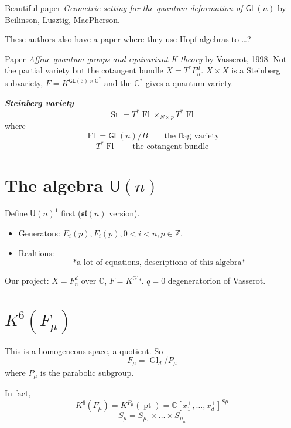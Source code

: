 \begin{thing4}{Beautiful paper}\leavevmode
	\textit{Geometric setting for the quantum deformation of $\mathsf{GL}(n)$} by Beilinson, Lusztig, MacPherson. 
\end{thing4}

\begin{remark}[Altan]\leavevmode
	These authors also have a paper where they use Hopf algebras to …?
\end{remark}

\begin{thing4}{Paper}\leavevmode
	\textit{Affine quantum groups and equivariant K-theory} by Vasserot, 1998. Not the partial variety but the cotangent bundle $X=T^*F_n^d$. $X\times X$ is a Steinberg subvariety, $F=K^{\mathsf{GL}(?)\times \mathbb{C}^{*}}$ and the $\mathbb{C}^*$ gives a quantum variety.
\end{thing4}

\begin{defn}[Altan]\leavevmode
	\textit{\textbf{Steinberg variety}}
	 \[\operatorname{St}=T^*\operatorname{Fl}\times_{N\times p}T^*\operatorname{Fl}\]
	 where \[\operatorname{Fl}=\mathsf{GL}(n)/B\qquad \text{the flag variety} \]
	 \[T^*\operatorname{Fl}\qquad \text{the cotangent bundle} \]
\end{defn}

\section{The algebra $\mathsf{U}(n)$}
Define $\mathsf{U}(n)^1$ first ($\mathfrak{sl}(n)$ version).

\begin{itemize}
\item Generators: $E_i(p),F_i(p), 0<i<n,p\in\mathbb{Z}$.
\item Realtions:
	\[\text{*a lot of equations, descriptiono of this algebra*} \]
	
\end{itemize}

\begin{thing6}{Our project:}\leavevmode
	$X=F_n^d$ over $\mathbb{C}$, $F=K^{\operatorname{Gl}_d}$. $q=0$ degeneratorion of Vasserot.
\end{thing6}


\section{$K^6(F_\mu)$}
This is a homogeneous space, a quotient. So
\[F_\mu=\operatorname{Gl}_d/P_\mu\]
where $P_\mu$ is the parabolic subgroup.

In fact,
\[K^6(F_\mu)=K^{P_\mu}(\operatorname{pt})=\mathbb{C}[x_1^\pm ,\ldots,x_d^\pm]^{S\mu} \]
\[S_\mu=S_{\mu_1}\times \ldots \times S_{\mu_n}\]




